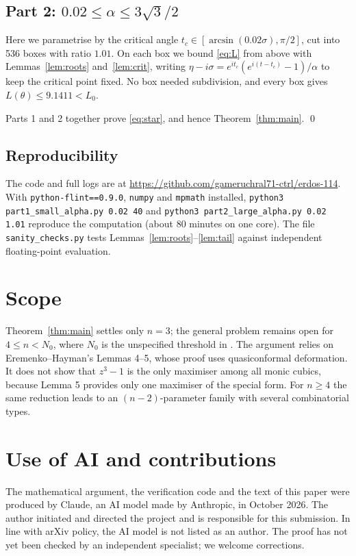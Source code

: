 \documentclass[11pt]{amsart}
\theoremstyle{remark}
\begin{document}
\subsection*{Part 2: $0.02\le\alpha\le3\sqrt3/2$}
Here we parametrise by the critical angle $t_c\in[\arcsin(0.02\sigma),\pi/2]$, cut into 536 boxes with ratio $1.01$. On each box we bound \eqref{eq:L} from above with Lemmas~\ref{lem:roots} and~\ref{lem:crit}, writing $\eta-i\sigma=e^{it_c}(e^{i(t-t_c)}-1)/\alpha$ to keep the critical point fixed. No box needed subdivision, and every box gives $L(\theta)\le9.1411<L_0$.

Parts 1 and 2 together prove \eqref{eq:star}, and hence Theorem~\ref{thm:main}. \qed

\subsection*{Reproducibility}
The code and full logs are at \url{https://github.com/gameruchral71-ctrl/erdos-114}. With \texttt{python-flint==0.9.0}, \texttt{numpy} and \texttt{mpmath} installed, \texttt{python3 part1\_small\_alpha.py 0.02 40} and \texttt{python3 part2\_large\_alpha.py 0.02 1.01} reproduce the computation (about 80 minutes on one core). The file \texttt{sanity\_checks.py} tests Lemmas~\ref{lem:roots}--\ref{lem:tail} against independent floating-point evaluation.

\section{Scope}
Theorem~\ref{thm:main} settles only $n=3$; the general problem remains open for $4\le n<N_0$, where $N_0$ is the unspecified threshold in \cite{Tao}. The argument relies on Eremenko--Hayman's Lemmas 4--5, whose proof uses quasiconformal deformation. It does not show that $z^3-1$ is the only maximiser among all monic cubics, because Lemma 5 provides only one maximiser of the special form. For $n\ge4$ the same reduction leads to an $(n-2)$-parameter family with several combinatorial types.

\section*{Use of AI and contributions}
The mathematical argument, the verification code and the text of this paper were produced by Claude, an AI model made by Anthropic, in October 2026. The author initiated and directed the project and is responsible for this submission. In line with arXiv policy, the AI model is not listed as an author. The proof has not yet been checked by an independent specialist; we welcome corrections.
\end{document}
